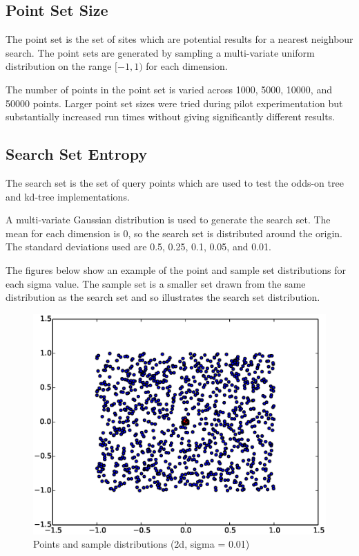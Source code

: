 \documentclass[mcs]{scsthesis}
\begin{document}
\subsection{Point Set Size}

The point set is the set of sites which are potential results for a nearest
neighbour search. The point sets are generated by sampling a multi-variate
uniform distribution on the range \([-1, 1)\) for each dimension.

The number of points in the point set is varied across 1000, 5000, 10000, and
50000 points. Larger point set sizes were tried during pilot experimentation but
substantially increased run times without giving significantly different
results.

\subsection{Search Set Entropy}

The search set is the set of query points which are used to test the odds-on
tree and kd-tree implementations.

A multi-variate Gaussian distribution is used to generate the search set. The
mean for each dimension is 0, so the search set is distributed around the
origin. The standard deviations used are 0.5, 0.25, 0.1, 0.05, and 0.01.

The figures below show an example of the point and sample set distributions for
each sigma value. The sample set is a smaller set drawn from the same
distribution as the search set and so illustrates the search set distribution.

\begin{figure}
\begin{center}
\includegraphics[scale=0.5]{diagrams/pts_plot_sigma0.01.eps}
\caption{Points and sample distributions (2d, sigma = 0.01)}
\label{fig:points_and_sample_2d_0_01}
\end{center}
\end{figure}
\end{document}
